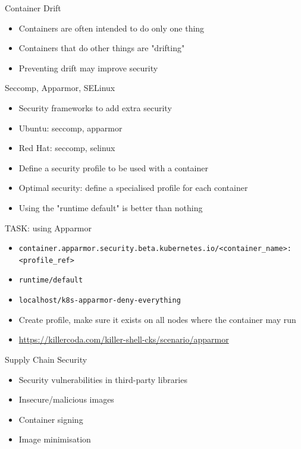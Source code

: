 \documentclass{dcpresentation}
\begin{document}

\begin{frame}{Container Drift}
 \begin{itemize}
  \item Containers are often intended to do only one thing
  \item Containers that do other things are "drifting"
  \item Preventing drift may improve security
 \end{itemize}
\end{frame}

\begin{frame}{Seccomp, Apparmor, SELinux}
  \begin{itemize}
  \item Security frameworks to add extra security
  \item Ubuntu: seccomp, apparmor
  \item Red Hat: seccomp, selinux
  \item Define a security profile to be used with a container
  \item Optimal security: define a specialised profile for each container
  \item Using the "runtime default" is better than nothing
  \end{itemize}
\end{frame}

\begin{frame}{TASK: using Apparmor}
 \begin{itemize}
  \item \texttt{\scriptsize container.apparmor.security.beta.kubernetes.io/<container\_name>: <profile\_ref>}
  \item \texttt{runtime/default}
  \item \texttt{localhost/k8s-apparmor-deny-everything}
  \item Create profile, make sure it exists on all nodes where the container may run
  \item \url{https://killercoda.com/killer-shell-cks/scenario/apparmor}
 \end{itemize}
\end{frame}

\begin{frame}{Supply Chain Security}
  \begin{itemize}
  \item Security vulnerabilities in third-party libraries
  \item Insecure/malicious images
  \item Container signing
  \item Image minimisation
  \end{itemize}
\end{frame}
\end{document}
